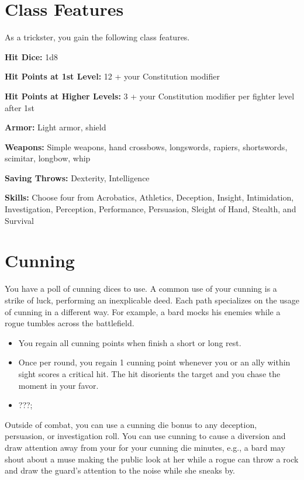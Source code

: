 \begin{multicols*}{2}

\section*{Class Features} 

As a trickster, you gain the following class features.

\textbf{Hit Dice:} 1d8

\textbf{Hit Points at 1st Level:} 12 + your Constitution modifier

\textbf{Hit Points at Higher Levels:} 3 + your Constitution modifier per fighter level after 1st


\textbf{Armor:} Light armor, shield

\textbf{Weapons:} Simple weapons, hand crossbows, longswords, rapiers, shortswords, scimitar, longbow, whip

\textbf{Saving Throws:} Dexterity, Intelligence

\textbf{Skills:} Choose four from Acrobatics, Athletics, Deception, Insight, Intimidation, Investigation, Perception, Performance, Persuasion, Sleight of Hand, Stealth, and Survival
    
\section*{Cunning} 

You have a poll of cunning dices to use. A common use of your cunning is a strike of luck, performing an inexplicable deed. Each path specializes on the usage of cunning in a different way. For example, a bard mocks his enemies while a rogue tumbles across the battlefield.



\begin{itemize}
    \item You regain all cunning points when finish a short or long rest.
    \item Once per round, you regain 1 cunning point whenever you or an ally within sight scores a critical hit. The hit disorients the target and you chase the moment in your favor.
    \item ???;
\end{itemize}

Outside of combat, you can use a cunning die bonus to any deception, persuasion, or investigation roll. You can use cunning to cause a diversion and draw attention away from your for your cunning die minutes, e.g., a bard may shout about a muse making the public look at her while a rogue can throw a rock and draw the guard's attention to the noise while she sneaks by.


\end{multicols*}
